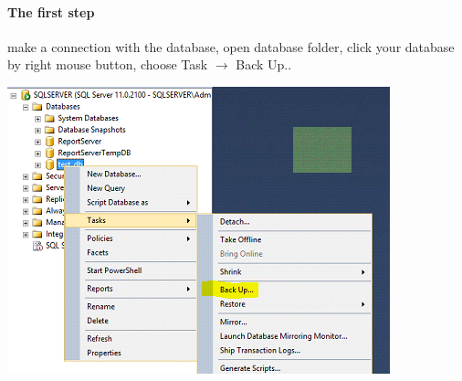 \documentclass[english]{article}
\begin{document}
\paragraph{The first step} make a connection with the database, open database folder, click your database by right mouse button, choose Task $\rightarrow $ Back Up.. \\
\centerline{\includegraphics[scale=1]{administration/1}}
\end{document}
